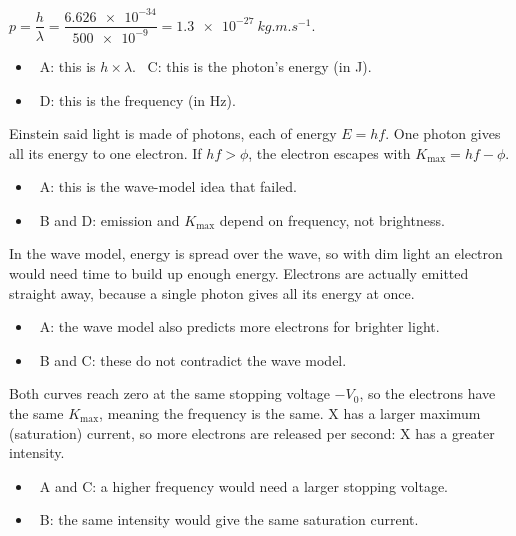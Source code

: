 \documentclass[12pt]{article}
\begin{document}
\begin{practiceanswers}
\begin{practiceans}
  $p = \dfrac{h}{\lambda} = \dfrac{\num{6.626e-34}}{\num{500e-9}} = \qty{1.3e-27}{kg.m.s^{-1}}$.
  \begin{itemize}
    \item \xmark\ A: this is $h \times \lambda$. \quad \xmark\ C: this is the photon's energy (in J).
    \item \xmark\ D: this is the frequency (in Hz).
  \end{itemize}
\end{practiceans}

\begin{practiceans}
  Einstein said light is made of photons, each of energy $E = hf$. One photon gives all its energy to one
  electron. If $hf > \phi$, the electron escapes with $K_\mathrm{max} = hf - \phi$.
  \begin{itemize}
    \item \xmark\ A: this is the wave-model idea that failed.
    \item \xmark\ B and D: emission and $K_\mathrm{max}$ depend on frequency, not brightness.
  \end{itemize}
\end{practiceans}

\begin{practiceans}
  In the wave model, energy is spread over the wave, so with dim light an electron would need time to
  build up enough energy. Electrons are actually emitted straight away, because a single photon gives
  all its energy at once.
  \begin{itemize}
    \item \xmark\ A: the wave model also predicts more electrons for brighter light.
    \item \xmark\ B and C: these do not contradict the wave model.
  \end{itemize}
\end{practiceans}

\begin{practiceans}
  Both curves reach zero at the same stopping voltage $-V_0$, so the electrons have the same
  $K_\mathrm{max}$, meaning the frequency is the same. X has a larger maximum (saturation) current, so
  more electrons are released per second: X has a greater intensity.
  \begin{itemize}
    \item \xmark\ A and C: a higher frequency would need a larger stopping voltage.
    \item \xmark\ B: the same intensity would give the same saturation current.
  \end{itemize}
\end{practiceans}


\end{practiceanswers}
\end{document}

